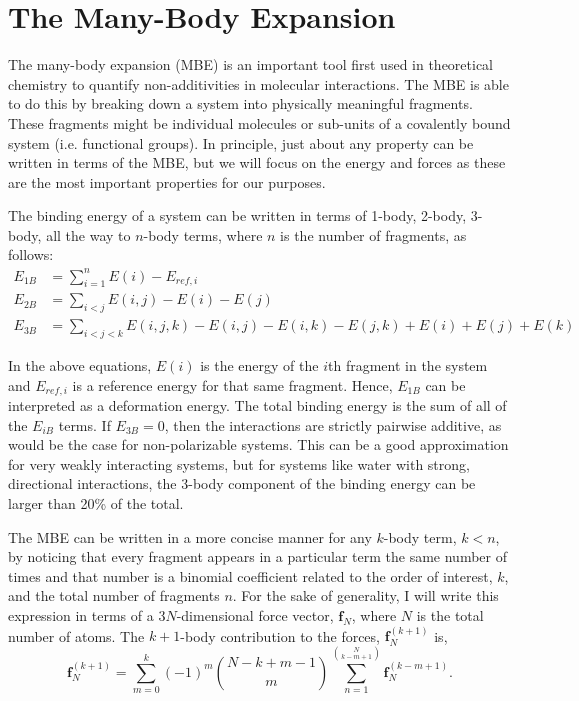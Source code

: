 \documentclass[11pt, proquest]{uwthesis}[2020/02/24]
\begin{document}
\chapter{The Many-Body Expansion}

\par The many-body expansion (MBE) is an important tool first used in theoretical chemistry to quantify non-additivities in molecular interactions.\autocite{hankins_hydrogen-bond_1970} The MBE is able to do this by breaking down a system into physically meaningful fragments. These fragments might be individual molecules or sub-units of a covalently bound system (i.e. functional groups). In principle, just about any property can be written in terms of the MBE, but we will focus on the energy and forces as these are the most important properties for our purposes.

\par The binding energy of a system can be written in terms of 1-body, 2-body, 3-body, all the way to $n$-body terms, where $n$ is the number of fragments, as follows:
\begin{align}
    E_{1B} &= \sum_{i=1}^nE(i)-E_{ref,i} \\
    E_{2B} &= \sum_{i<j}E(i,j)-E(i)-E(j) \\
    E_{3B} &= \sum_{i<j<k} E(i,j,k)-E(i,j)-E(i,k)-E(j,k)+E(i)+E(j)+E(k)
\end{align}

In the above equations, $E(i)$ is the energy of the $i$th fragment in the system and $E_{ref,i}$ is a reference energy for that same fragment. Hence, $E_{1B}$ can be interpreted as a deformation energy. The total binding energy is the sum of all of the $E_{iB}$ terms. If $E_{3B}=0$, then the interactions are strictly pairwise additive, as would be the case for non-polarizable systems. This can be a good approximation for very weakly interacting systems, but for systems like water with strong, directional interactions, the 3-body component of the binding energy can be larger than 20\% of the total.\autocite{xantheas_ab_1994}

\par The MBE can be written in a more concise manner for any $k$-body term, $k<n$, by noticing that every fragment appears in a particular term the same number of times and that number is a binomial coefficient related to the order of interest, $k$, and the total number of fragments $n$. For the sake of generality, I will write this expression in terms of a 3$N$-dimensional force vector, $\mathbf{f}_N$, where $N$ is the total number of atoms. The $k+1$-body contribution to the forces, $\mathbf{f}_N^{(k+1)}$ is,
\begin{equation}
    \mathbf{f}_N^{(k+1)}=\sum_{m=0}^k(-1)^{m}\binom{N-k+m-1}{m}\sum_{n=1}^{\binom{N}{k-m+1}}\mathbf{f}_N^{(k-m+1)}.
\end{equation}
\end{document}

